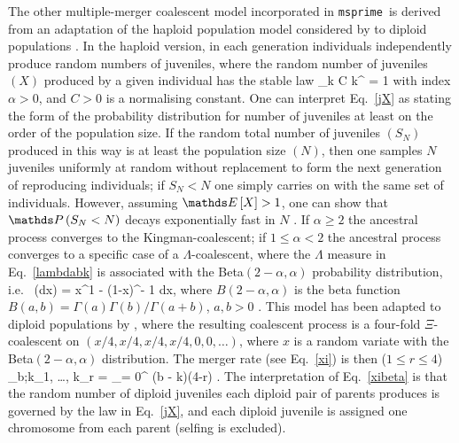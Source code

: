 \documentclass{article}
\newcommand{\msprime}[0]{\texttt{msprime}}
\begin{document}
The other multiple-merger coalescent model incorporated in \msprime\ is derived
from an adaptation of the haploid population model considered by
\cite{schweinsberg03} to diploid populations \citep{BLS15}.  In the haploid
version, in each generation individuals independently produce random numbers of
juveniles, where the random  number of juveniles $(X)$ produced by a given
individual  has the stable law \be\label{jX} \lim_{k\to \infty} C k^\alpha
{} = 1 \ee with index $\alpha > 0$, and $C > 0$ is a normalising
constant.   One can interpret  Eq.~\eqref{jX} as  stating the form of the
probability distribution  for number of juveniles at least on the order of the
population size.     If the random  total number of juveniles $(S_N)$ produced
in this way is at least the population size $(N)$, then one samples  $N$
juveniles uniformly at random without replacement to form the next generation
of  reproducing individuals; if  $S_N < N$ one simply  carries on with  the
same  set of individuals.   However,   assuming  $\EE{X} > 1$, one can show
that $\prb{S_N < N}$ decays exponentially fast in $N$ \citep{schweinsberg03}.
If $\alpha \ge 2$ the ancestral process converges to the Kingman-coalescent; if
$1 \le \alpha < 2$ the ancestral process converges to a specific case of a
$\Lambda$-coalescent, where the $\Lambda$ measure in Eq.~\eqref{lambdabk} is
associated with the Beta$(2-\alpha, \alpha)$ probability distribution, i.e.\
\be\label{Fbeta} \Lambda(dx) =  
x^{1 - \alpha}(1-x)^{\alpha - 1}  dx, \ee where $B(2-\alpha,\alpha)$ is the
beta function $B(a,b) = \Gamma(a)\Gamma(b)/\Gamma(a+b)$, $a,b > 0$
\citep{schweinsberg03}.
This model has been adapted to diploid populations
by \cite{BLS15}, where  the resulting coalescent process
is a  four-fold $\Xi$-coalescent on  $(x/4, x/4, x/4, x/4, 0, 0, \ldots)$,
where $x$ is a random variate with  the Beta$(2-\alpha,\alpha)$ distribution.
The merger rate (see Eq.~\eqref{xi}) is then ($1 \le r \le 4$)
\be\label{xibeta} \lambda_{b;k_1, \ldots, k_r} = \sum_{\ell = 0}^{ (b -
k)\wedge (4-r) } \binom{b-k}{\ell} \frac{ (4)_{r+\ell} }{4^{k+\ell}}
\frac{B(k+\ell - \alpha, b-k-\ell + \alpha ) }{B(2-\alpha,\alpha)} \ee
\citep{blath2016site,BLS15}. The interpretation of Eq.~\eqref{xibeta} is  that the
random   number of diploid  juveniles each  diploid pair of parents  produces
is  governed by  the law in Eq.~\eqref{jX},   and   each diploid juvenile  is
assigned  one chromosome  from each parent (selfing is excluded).
\end{document}
